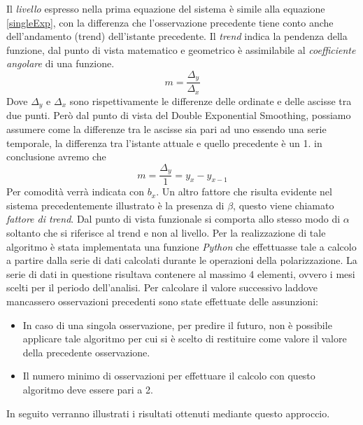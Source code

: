 Il \textit{livello} espresso nella prima equazione del sistema è simile alla equazione \ref{singleExp}, con la differenza che l'osservazione precedente tiene conto anche dell'andamento (trend) dell'istante precedente.
Il \textit{trend} indica la pendenza della funzione, dal punto di vista matematico e geometrico è assimilabile al \textit{coefficiente angolare} di una funzione.
\begin{equation}
m=\dfrac{\Delta_{y}}{\Delta_{x}}
\end{equation}
Dove $\Delta_{y}$ e $\Delta_{x}$ sono rispettivamente le differenze delle ordinate e delle ascisse tra due punti. Però dal punto di vista del Double Exponential Smoothing, possiamo assumere come la differenze tra le ascisse sia pari ad uno essendo una serie temporale, la differenza tra l'istante attuale e quello precedente è un 1. in conclusione avremo che 
\begin{equation}
m=\dfrac{\Delta_{y}}{1}= y_{x}-y_{x-1}
\end{equation}
Per comodità verrà indicata con  $b_{x}$.
Un altro fattore che risulta evidente nel sistema precedentemente illustrato è la presenza di $\beta$, questo viene chiamato \textit{fattore di trend}. Dal punto di vista funzionale si comporta allo stesso modo di $\alpha$ soltanto che si riferisce al trend e non al livello.
Per la realizzazione di tale algoritmo è stata implementata una funzione \textit{Python} che effettuasse tale a calcolo a partire dalla serie di dati calcolati durante le operazioni della polarizzazione.
La serie di dati in questione risultava contenere al massimo 4 elementi, ovvero i mesi scelti per il periodo dell'analisi. Per calcolare il valore successivo laddove mancassero osservazioni precedenti sono state effettuate delle assunzioni:
\begin{itemize}
\item In caso di una singola osservazione, per predire il futuro, non è possibile applicare tale algoritmo per cui si è scelto di restituire come valore il valore della precedente  osservazione.
\item Il numero minimo di osservazioni per effettuare il calcolo con questo algoritmo deve essere pari a 2.
\end{itemize}
In seguito verranno illustrati i risultati ottenuti mediante questo approccio.
